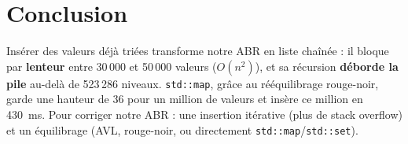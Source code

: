 \documentclass[11pt,a4paper]{article}
\begin{document}
\section{Conclusion}

Insérer des valeurs déjà triées transforme notre ABR en liste chaînée : il bloque par
\textbf{lenteur} entre 30\,000 et 50\,000 valeurs ($O(n^2)$), et sa récursion
\textbf{déborde la pile} au-delà de 523\,286 niveaux. \texttt{std::map}, grâce au
rééquilibrage rouge-noir, garde une hauteur de 36 pour un million de valeurs et insère ce
million en 430~ms. Pour corriger notre ABR : une insertion itérative (plus de stack
overflow) et un équilibrage (AVL, rouge-noir, ou directement \texttt{std::map}/\texttt{std::set}).
\end{document}
